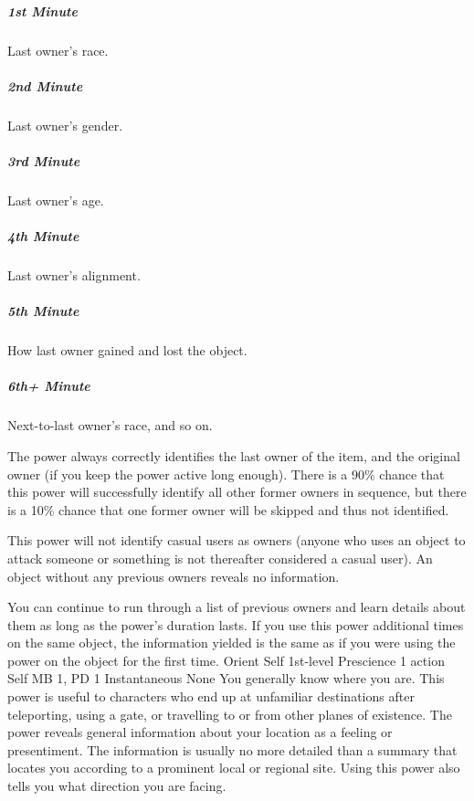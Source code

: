 \subparagraph{1st Minute}
  Last owner's race.

\subparagraph{2nd Minute}
  Last owner's gender.

\subparagraph{3rd Minute}
  Last owner's age.

\subparagraph{4th Minute}
  Last owner's alignment.

\subparagraph{5th Minute}
  How last owner gained and lost the object.

\subparagraph{6th+ Minute}
  Next-to-last owner's race, and so on.

The power always correctly identifies the last owner of the item,
and the original owner
(if you keep the power active long enough).
There is a 90\% chance
that this power will successfully identify all other former owners
in sequence,
but there is a 10\% chance that one former owner
will be skipped and thus not identified.

This power will not identify casual users as owners
(anyone who uses an object to attack someone
or something is not thereafter considered a casual user).
An object without any previous owners reveals no information.

You can continue to run through a list of previous owners
and learn details about them as long as the power's duration lasts.
If you use this power additional times on the same object,
the information yielded is the same
as if you were using the power on the object for the first time.
\DndPowerHeader%
    {Orient Self\label{pwr:orient_self}}
    {1st-level Prescience}
    {1 action}
    {Self}
    {MB 1, PD 1}
    {Instantaneous}
    {None}
You generally know where you are. This power
is useful to characters who end up at unfamiliar destinations
after teleporting, using a gate, or travelling to or from
other planes of existence. The power reveals general information
about your location as a feeling or presentiment. The information
is usually no more detailed than a summary that locates you
according to a prominent local or regional site. Using this
power also tells you what direction you are facing.

